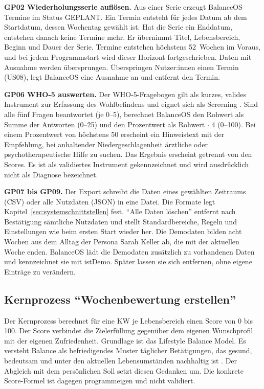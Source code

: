 \textbf{GP02 Wiederholungsserie auflösen.} Aus einer Serie erzeugt BalanceOS Termine im Status GEPLANT. Ein Termin entsteht für jedes Datum ab dem Startdatum, dessen Wochentag gewählt ist. Hat die Serie ein Enddatum, entstehen danach keine Termine mehr. Er übernimmt Titel, Lebensbereich, Beginn und Dauer der Serie. Termine entstehen höchstens 52~Wochen im Voraus, und bei jedem Programmstart wird dieser Horizont fortgeschrieben. Daten mit Ausnahme werden übersprungen. Überspringen Nutzer:innen einen Termin (US08), legt BalanceOS eine Ausnahme an und entfernt den Termin.

\textbf{GP06 WHO-5 auswerten.} Der WHO-5-Fragebogen gilt als kurzes, valides Instrument zur Erfassung des Wohlbefindens und eignet sich als Screening \parencite[S.~167]{topp2015}. Sind alle fünf Fragen beantwortet (je 0--5), berechnet BalanceOS den Rohwert als Summe der Antworten (0--25) und den Prozentwert als Rohwert $\cdot$ 4 (0--100). Bei einem Prozentwert von höchstens 50 erscheint ein Hinweistext mit der Empfehlung, bei anhaltender Niedergeschlagenheit ärztliche oder psychotherapeutische Hilfe zu suchen. Das Ergebnis erscheint getrennt von den Scores. Es ist als validiertes Instrument gekennzeichnet und wird ausdrücklich nicht als Diagnose bezeichnet.

\textbf{GP07 bis GP09.} Der Export schreibt die Daten eines gewählten Zeitraums (CSV) oder alle Nutzdaten (JSON) in eine Datei. Die Formate legt Kapitel~\ref{sec:systemschnittstellen} fest. \enquote{Alle Daten löschen} entfernt nach Bestätigung sämtliche Nutzdaten und stellt Standardbereiche, Regeln und Einstellungen wie beim ersten Start wieder her. Die Demodaten bilden acht Wochen aus dem Alltag der Persona Sarah Keller ab, die mit der aktuellen Woche enden. BalanceOS lädt die Demodaten zusätzlich zu vorhandenen Daten und kennzeichnet sie mit istDemo. Später lassen sie sich entfernen, ohne eigene Einträge zu verändern.

\subsection{Kernprozess \enquote{Wochenbewertung erstellen}}\label{sec:kernprozess}
Der Kernprozess berechnet für eine \ac{KW} je Lebensbereich einen Score von 0 bis 100. Der Score verbindet die Zielerfüllung gegenüber dem eigenen Wunschprofil mit der eigenen Zufriedenheit. Grundlage ist das Lifestyle Balance Model. Es versteht Balance als befriedigendes Muster täglicher Betätigungen, das gesund, bedeutsam und unter den aktuellen Lebensumständen nachhaltig ist \parencite[S.~11]{matuska2008}. Der Abgleich mit dem persönlichen Soll setzt diesen Gedanken um. Die konkrete Score-Formel ist dagegen programmeigen und nicht validiert.

